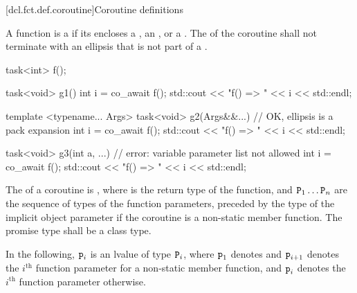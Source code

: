 [dcl.fct.def.coroutine]{Coroutine definitions}%
%

\pnum
A function is a  if its  encloses a
,
an ,
or a .
The  of the coroutine shall not
terminate with an ellipsis that is not part of
a .

\pnum
\begin{example}
\begin{codeblock}
task<int> f();

task<void> g1() {
  int i = co_await f();
  std::cout << "f() => " << i << std::endl;
}

template <typename... Args>
task<void> g2(Args&&...) {      // OK, ellipsis is a pack expansion
  int i = co_await f();
  std::cout << "f() => " << i << std::endl;
}

task<void> g3(int a, ...) {     // error: variable parameter list not allowed
  int i = co_await f();
  std::cout << "f() => " << i << std::endl;
}
\end{codeblock}
\end{example}

\pnum
{}%
The  of a coroutine is
,
where
 is the return type of the function, and
$\texttt{P}_1 \dotsc \texttt{P}_n$ are the sequence of types of the function parameters,
preceded by the type of the implicit object parameter
if the coroutine is a non-static member function.
The promise type shall be a class type.

\pnum
In the following, $\texttt{p}_i$ is an lvalue of type $\texttt{P}_i$,
where
$\texttt{p}_1$ denotes  and
$\texttt{p}_{i+1}$ denotes the $i^\textrm{th}$ function parameter
for a non-static member function, and
$\texttt{p}_i$ denotes
the $i^\textrm{th}$ function parameter otherwise.

